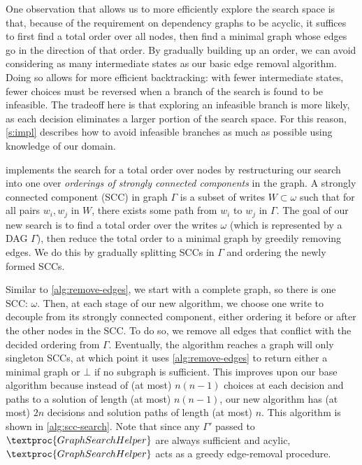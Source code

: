 One observation that allows us to more efficiently explore the search space is that,
because of the requirement on dependency graphs to be acyclic, it suffices to first
find a total order over all nodes, then find a minimal graph whose edges go in the
direction of that order. By gradually building up an order, we can avoid considering
as many intermediate states as our basic edge removal algorithm.
Doing so allows for more efficient backtracking: with fewer intermediate states,
fewer choices must be reversed when a branch of the search is found to be infeasible.
The tradeoff here is that exploring an infeasible branch is more likely,
as each decision eliminates a larger portion of the search space.
For this reason, \autoref{s:impl} describes how to avoid infeasible branches
as much as possible using knowledge of our domain.

\depsynth implements the search for a total order over nodes
by restructuring our search into one over \textit{orderings of
strongly connected components} in the graph. A strongly connected component (SCC) in graph $\Gamma$ is a subset of
writes $W\subset \omega$ such that for all pairs $w_i,w_j$ in $W$, there exists some path from $w_i$ to $w_j$
in $\Gamma$. The goal of our new search is to find a total order over the writes $\omega$ (which is represented
by a DAG $\Gamma$), then reduce the total order to a minimal graph by greedily removing edges.
We do this by gradually splitting SCCs in $\Gamma$ and ordering the newly formed SCCs.

Similar to \autoref{alg:remove-edges}, we start with a complete graph, so there is one SCC: $\omega$.
Then, at each stage of our new algorithm, we choose one write to decouple from its strongly connected component,
either ordering it before or after the other nodes in the SCC. To do so, we remove all edges that conflict
with the decided ordering from $\Gamma$. Eventually, the algorithm reaches a graph will only singleton SCCs,
at which point it uses \autoref{alg:remove-edges} to return either a minimal graph or $\bot$ if no subgraph
is sufficient. This improves upon our base algorithm because instead of (at most) $n(n-1)$
choices at each decision and paths to a solution of length (at most) $n(n-1)$, our new algorithm has (at most) $2n$
decisions and solution paths of length (at most) $n$. This algorithm is shown in \autoref{alg:scc-search}.
Note that since any $\Gamma'$ passed to $\textproc{GraphSearchHelper}$ are always
sufficient and acylic, $\textproc{GraphSearchHelper}$ acts as a greedy edge-removal procedure.

